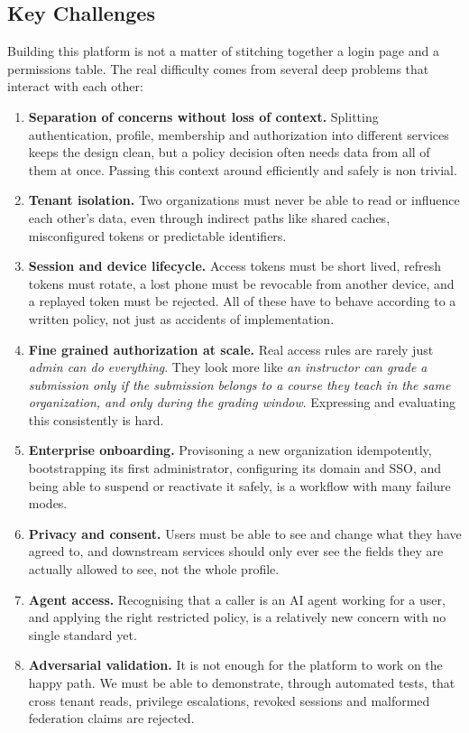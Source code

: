 \documentclass[11pt,a4paper]{article}
\begin{document}
\subsection{Key Challenges}

Building this platform is not a matter of stitching together a login page and a permissions table. The real difficulty comes from several deep problems that interact with each other:

\begin{enumerate}[leftmargin=1.5em,itemsep=2pt]
    \item \textbf{Separation of concerns without loss of context.} Splitting authentication, profile, membership and authorization into different services keeps the design clean, but a policy decision often needs data from all of them at once. Passing this context around efficiently and safely is non trivial.
    \item \textbf{Tenant isolation.} Two organizations must never be able to read or influence each other's data, even through indirect paths like shared caches, misconfigured tokens or predictable identifiers.
    \item \textbf{Session and device lifecycle.} Access tokens must be short lived, refresh tokens must rotate, a lost phone must be revocable from another device, and a replayed token must be rejected. All of these have to behave according to a written policy, not just as accidents of implementation.
    \item \textbf{Fine grained authorization at scale.} Real access rules are rarely just \textit{admin can do everything}. They look more like \textit{an instructor can grade a submission only if the submission belongs to a course they teach in the same organization, and only during the grading window}. Expressing and evaluating this consistently is hard.
    \item \textbf{Enterprise onboarding.} Provisoning a new organization idempotently, bootstrapping its first administrator, configuring its domain and SSO, and being able to suspend or reactivate it safely, is a workflow with many failure modes.
    \item \textbf{Privacy and consent.} Users must be able to see and change what they have agreed to, and downstream services should only ever see the fields they are actually allowed to see, not the whole profile.
    \item \textbf{Agent access.} Recognising that a caller is an AI agent working for a user, and applying the right restricted policy, is a relatively new concern with no single standard yet.
    \item \textbf{Adversarial validation.} It is not enough for the platform to work on the happy path. We must be able to demonstrate, through automated tests, that cross tenant reads, privilege escalations, revoked sessions and malformed federation claims are rejected.
\end{enumerate}
\end{document}
